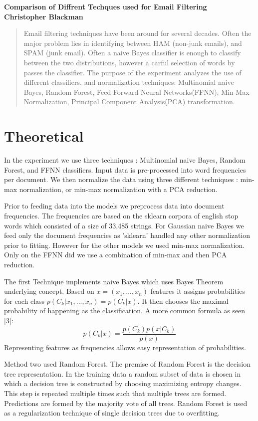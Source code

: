 \documentclass[a4paper,11pt]{article}
\begin{document}
\begin{center}
  \bf{Comparison of Diffrent Techques used for Email Filtering}\\
  \bf{Christopher Blackman}\\
\end{center}
\begin{abstract}
Email filtering techniques have been around for several decades. Often the major problem lies in identifying between HAM (non-junk emails), and SPAM (junk email). Often a naive Bayes classifier is enough to classify between the two distributions, however a carful selection of words by passes the classifier. The purpose of the experiment analyzes the use of different classifiers, and normalization techniques: Multinomial naive Bayes, Random Forest, Feed Forward Neural  Networks(FFNN), Min-Max Normalization, Principal Component Analysis(PCA) transformation. 
\end{abstract}
\newpage
\section*{Theoretical}
In the experiment we use three techniques : Multinomial naive Bayes, Random Forest, and FFNN classifiers. Input data is pre-processed into word frequencies per document. We then normalize the data using three different techniques :  min-max normalization, or min-max normalization with a PCA reduction. 

Prior to feeding data into the models we preprocess data into document frequencies. The frequencies are based on the sklearn corpora of english stop words which consisted of a size of 33,485 strings. For Gaussian naive Bayes we feed only the document frequencies as 'sklearn' handled any other normalization prior to fitting. However for the other models we used min-max normalization. Only on the FFNN did we use a combination of min-max and then PCA reduction.

The first Technique implements naive Bayes which uses Bayes Theorem underlying concept. Based on $x = (x_1,...,x_n)$ features it assigns probabilities for each class $p(C_k | x_1,...,x_n) = p(C_k|x)$. It then chooses the maximal probability of happening as the classification. A more common formula as seen [3]:
$$p(C_k|x) = \frac{p(C_k)p(x|C_k)}{p(x)}$$
Representing features as frequencies allows easy representation of probabilities. 

Method two used Random Forest. The premise of Random Forest is the decision tree representation. In the training data a random subset of data is chosen in which a decision tree is constructed by choosing maximizing entropy changes. This step is repeated multiple times such that multiple trees are formed. Predictions are formed by the majority vote of all trees. Random Forest is used as a regularization technique of single decision trees due to overfitting.
\end{document}
